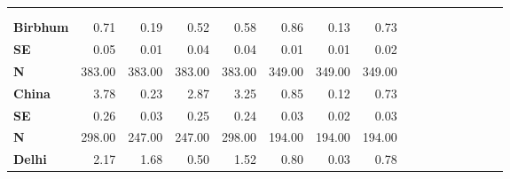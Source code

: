 \begin{tabular}{@{\extracolsep{5pt}}lrrrrrrrrrrrrrrr}
\toprule
&  &  &  &  &  &  &  \\
{\bf } &  &  &  &  &  &  &  \\
\hline
{\bf Birbhum} & 0.71\phantom{***} & 0.19\phantom{***} & 0.52\phantom{***} & 0.58\phantom{***} & 0.86\phantom{***} & 0.13\phantom{***} & 0.73\phantom{***} \\
{\bf SE} & 0.05\phantom{***} & 0.01\phantom{***} & 0.04\phantom{***} & 0.04\phantom{***} & 0.01\phantom{***} & 0.01\phantom{***} & 0.02\phantom{***} \\
{\bf N} & 383.00\phantom{***} & 383.00\phantom{***} & 383.00\phantom{***} & 383.00\phantom{***} & 349.00\phantom{***} & 349.00\phantom{***} & 349.00\phantom{***} \\
{\bf China} & 3.78\phantom{***} & 0.23\phantom{***} & 2.87\phantom{***} & 3.25\phantom{***} & 0.85\phantom{***} & 0.12\phantom{***} & 0.73\phantom{***} \\
{\bf SE} & 0.26\phantom{***} & 0.03\phantom{***} & 0.25\phantom{***} & 0.24\phantom{***} & 0.03\phantom{***} & 0.02\phantom{***} & 0.03\phantom{***} \\
{\bf N} & 298.00\phantom{***} & 247.00\phantom{***} & 247.00\phantom{***} & 298.00\phantom{***} & 194.00\phantom{***} & 194.00\phantom{***} & 194.00\phantom{***} \\
{\bf Delhi} & 2.17\phantom{***} & 1.68\phantom{***} & 0.50\phantom{***} & 1.52\phantom{***} & 0.80\phantom{***} & 0.03\phantom{***} & 0.78\phantom{***} \\

\end{tabular}
